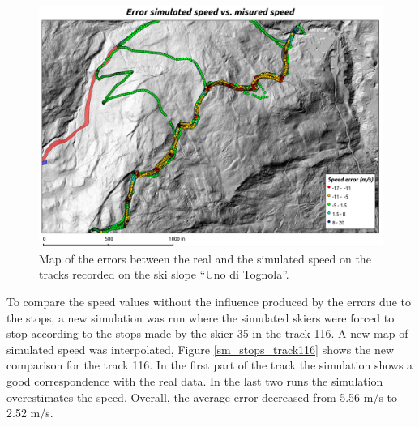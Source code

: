 \documentclass[12pt,a4paper,twoside]{book}
\begin{document}
\begin{figure}
  \centering
    \includegraphics[width=\textwidth]{images/map_error.eps}
    \caption{Map of the errors between the real and the simulated speed on the tracks recorded on the ski slope ``Uno di Tognola''.}\label{map_error}
\end{figure}

To compare the speed values without the influence produced by the errors due to the stops, a new simulation was run where the simulated skiers were forced to stop according to the stops made by the skier 35 in the track 116. A new map of simulated speed was interpolated, Figure \ref{sm_stops_track116} shows the new comparison for the track 116. In the first part of the track the simulation shows a good correspondence with the real data. In the last two runs the simulation overestimates the speed. Overall, the average error decreased from 5.56 m/s to 2.52 m/s.
\end{document}
